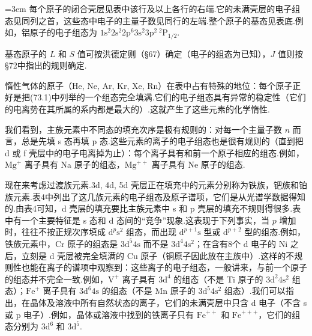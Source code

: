 \emergencystretch=3em%
每个原子的闭合壳层见表中该行及以上各行的右端.它的未满壳层的电子组态见同列之首，这些态中电子的主量子数见同行的左端.整个原子的基态见表底.例如，铝原子的电子组态为 $1\mathrm{s}^{2}2\mathrm{s}^{2}2\mathrm{p}^{6}\allowbreak 3\mathrm{s}^{2}3\mathrm{p}^{2}\,{}^{2}\mathrm{P}_{1/2}$.
\emergencystretch=0pt%

基态原子的 $L$ 和 $S$ 值可按洪德定则（§67）确定（电子的组态为已知），$J$ 值则按§72中指出的规则确定.

惰性气体的原子（He, Ne, Ar, Kr, Xe, Rn）在表中占有特殊的地位：每个原子正好是把(73.1)中列举的一个组态完全填满.它们的电子组态具有异常的稳定性（它们的电离势在其所属的系内都是最大的）.这就产生了这些元素的化学惰性.

我们看到，主族元素中不同态的填充次序是极有规则的：对每一个主量子数 $n$ 而言，总是先填 s 态再填 p 态.这些元素的离子的电子组态也是很有规则的（直到把 d 或 f 壳层中的电子电离掉为止）：每个离子具有和前一个原子相应的组态.例如，$\mathrm{Mg}^{+}$ 离子具有 Na 原子的组态，$\mathrm{Mg}^{++}$ 离子具有 Ne 原子的组态.

现在来考虑过渡族元素.3d, 4d, 5d 壳层正在填充中的元素分别称为铁族，钯族和铂族元素.表4中列出了这几族元素的电子组态及原子谱项，它们是从光谱学数据得知的.由表4可知，d 壳层的填充要比主族元素中 s 和 p 壳层的填充不规则得很多.表中有一个主要特征是 s 态和 d 态间的“竞争”现象.这表现于下列事实，当 $p$ 增加时，往往不按正规次序填成 $\mathrm{d}^{p}\mathrm{s}^{2}$ 组态，而出现 $\mathrm{d}^{p+1}\mathrm{s}$ 型或 $\mathrm{d}^{p+2}$ 型的组态.例如，铁族元素中，Cr 原子的组态是 $3\mathrm{d}^{5}4\mathrm{s}$ 而不是 $3\mathrm{d}^{4}4\mathrm{s}^{2}$；在含有8个 d 电子的 Ni 之后，立刻是 d 壳层被完全填满的 Cu 原子（铜原子因此放在主族中）.这样的不规则性也能在离子的谱项中观察到：这些离子的电子组态，一般讲来，与前一个原子的组态并不完全一致.例如，$\mathrm{V}^{+}$ 离子具有 $3\mathrm{d}^{4}$ 的组态（不是 Ti 原子的 $3\mathrm{d}^{2}4\mathrm{s}^{2}$ 组态）；$\mathrm{Fe}^{+}$ 离子具有 $3\mathrm{d}^{6}4\mathrm{s}$ 的组态（不是 Mn 原子的 $3\mathrm{d}^{5}4\mathrm{s}^{2}$ 组态）.我们可以指出，在晶体及溶液中所有自然状态的离子，它们的未满壳层中只含 d 电子（不含 s 或 p 电子）.例如，晶体或溶液中找到的铁离子只有 $\mathrm{Fe}^{++}$ 和 $\mathrm{Fe}^{+++}$，它们的组态分别为 $3\mathrm{d}^{6}$ 和 $3\mathrm{d}^{5}$.

